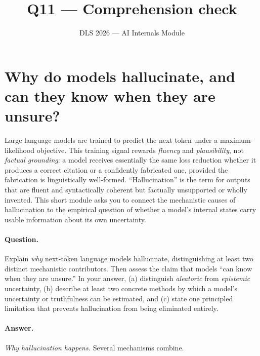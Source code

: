 \documentclass[11pt]{article}
\title{Q11 --- Comprehension check}
\author{DLS 2026 --- AI Internals Module}
\date{}
\begin{document}
\maketitle

\section*{Why do models hallucinate, and can they know when they are unsure?}

Large language models are trained to predict the next token under a maximum-likelihood objective. This training signal rewards \emph{fluency} and \emph{plausibility}, not \emph{factual grounding}: a model receives essentially the same loss reduction whether it produces a correct citation or a confidently fabricated one, provided the fabrication is linguistically well-formed. ``Hallucination'' is the term for outputs that are fluent and syntactically coherent but factually unsupported or wholly invented. This short module asks you to connect the mechanistic causes of hallucination to the empirical question of whether a model's internal states carry usable information about its own uncertainty.

\paragraph{Question.} Explain \emph{why} next-token language models hallucinate, distinguishing at least two distinct mechanistic contributors. Then assess the claim that models ``can know when they are unsure.'' In your answer, (a) distinguish \emph{aleatoric} from \emph{epistemic} uncertainty, (b) describe at least two concrete methods by which a model's uncertainty or truthfulness can be estimated, and (c) state one principled limitation that prevents hallucination from being eliminated entirely.

\paragraph{Answer.}

\emph{Why hallucination happens.} Several mechanisms combine.
\end{document}
